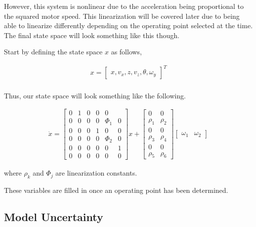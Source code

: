     However, this system is nonlinear due to the acceleration being proportional to the squared motor speed.
    This linearization will be covered later due to being able to linearize differently depending on the operating
    point selected at the time.
    The final state space will look something like this though.

    Start by defining the state space $x$ as follows,

    \begin{align}
        x = \begin{bmatrix} x, v_x, z, v_z, \theta, \omega_y \end{bmatrix}^T\\
    \end{align}

    Thus, our state space will look something like the following.

    \begin{align}
        \dot{x} = \begin{bmatrix} 0 & 1 & 0 & 0 & 0 \\ 0 & 0 & 0 & 0 & \Phi_1 & 0 \\
        0 & 0 & 0 & 1 & 0 & 0 \\ 0 & 0 & 0 & 0 & \Phi_2 & 0 \\
        0 & 0 & 0 & 0 & 0 & 1 \\ 0 & 0 & 0 & 0 & 0 & 0 \end{bmatrix} x +
        \begin{bmatrix} 0 & 0 \\ \rho_1 & \rho_2 \\ 0 & 0 \\ \rho_3 & \rho_4 \\
        0 & 0 \\ \rho_5 & \rho_6 \end{bmatrix} \begin{bmatrix} \omega_1 & \omega_2 \end{bmatrix}
    \end{align}

    where $\rho_k$ and $\Phi_j$ are linearization constants.

    These variables are filled in once an operating point has been determined.

    \subsection{Model Uncertainty}\label{subsec:model-uncertainty}

